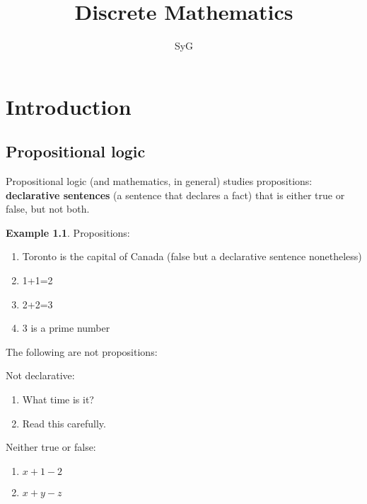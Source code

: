 \documentclass[12pt, a4paper]{book}
\begin{document}
  \theoremstyle{plain}
  \newtheorem{thm}{Theorem}[chapter]
  \newtheorem{lem}[thm]{Lemma}
  \newtheorem{prop}[thm]{Proposition}
  \newtheorem*{cor}{Corollary}


  \theoremstyle{definition}
  \newtheorem{defn}[thm]{Definition}
  \newtheorem{conj}{Conjecture}[section]
  \newtheorem{exmp}[thm]{Example}

  \theoremstyle{remark}
  \newtheorem*{rem}{Remark}
  \newtheorem*{note}{Note}


  \title{Discrete Mathematics}
  \author{SyG}
  \maketitle


\chapter{Introduction}

\section*{Propositional logic}

Propositional logic (and mathematics, in general) studies propositions: \textbf{declarative sentences} 
(a sentence that declares a fact) that is either true or false, but not both.

\begin{exmp}
    Propositions:
    \begin{enumerate}
        \item Toronto is the capital of Canada (false but a declarative sentence nonetheless)
        \item 1+1=2
        \item 2+2=3 
        \item 3 is a prime number
    \end{enumerate}
    The following are not propositions:

    Not declarative:
    \begin{enumerate}
        \item What time is it?
        \item Read this carefully.
    \end{enumerate}

    Neither true or false:

    \begin{enumerate}
        \item $x+1-2$
        \item $x+y-z$
    \end{enumerate}
\end{exmp}
\end{document}
